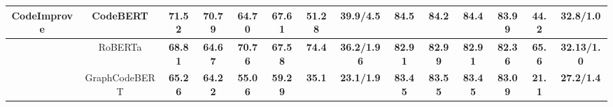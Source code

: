 \begin{table*}[htb!]
{\begin{tabular}{ccccccccc ccccc}
    \multirow{3}{*}{ CodeImprove} & CodeBERT & \textbf{71.52} 
      & \textbf{70.79}  & \textbf{64.70}&\textbf{67.61}&\textbf{51.28} & \textbf{39.9/4.5} &\textbf{84.5} &\textbf{84.2}&\textbf{84.4} &\textbf{83.99}  & \textbf{44.2}&  \textbf{32.8/1.0}\\\cline

    & RoBERTa &\textbf{68.81} &\textbf{64.67}  &\textbf{70.76}  &\textbf{67.58}  &\textbf{74.4} &\textbf{36.2/1.96} &\textbf{82.91} &\textbf{82.99} &\textbf{82.91} &\textbf{82.36} &\textbf{65.6}  & \textbf{32.13/1.0}  \\\cline

    & GraphCodeBERT &\textbf{65.26} &\textbf{64.22} &\textbf{55.06} &\textbf{59.29} &\textbf{35.1}  &\textbf{23.1/1.9} &\textbf{83.45} &\textbf{83.55} &\textbf{83.45} &\textbf{83.09} &\textbf{21.1}  &\textbf{27.2/1.4} \\\hline
  
  
\end{tabular}}
\end{table*}
